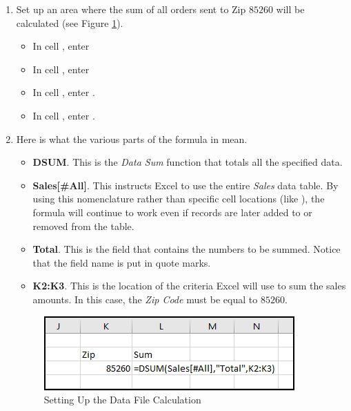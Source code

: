 \begin{enumbox}
	\begin{enumerate}
		\item Set up an area where the sum of all orders sent to Zip $ 85260 $ will be calculated (see Figure \ref{09:fig21}).
	
		\begin{itemize}
			\item In cell , enter 
			\item In cell , enter 
			\item In cell , enter  . 
			\item In cell , enter . 
		\end{itemize}
	
		\item Here is what the various parts of the formula in  mean.		
	
		\begin{itemize}
			\item \textbf{DSUM}. This is the \textit{Data Sum} function that totals all the specified data.
			\item \textbf{Sales[\#All]}. This instructs Excel to use the entire \textit{Sales} data table. By using this nomenclature rather than specific cell locations (like ), the formula will continue to work even if records are later added to or removed from the table.
			\item \textbf{Total}. This is the field that contains the numbers to be summed. Notice that the field name is put in quote marks.
			\item \textbf{K2:K3}. This is the location of the criteria Excel will use to sum the sales amounts. In this case, the \textit{Zip Code} must be equal to $ 85260 $.
		\end{itemize}	
	
		\begin{figure}[H]
			\centering
			\includegraphics[width=\maxwidth{.75\linewidth}]{gfx/ch09_fig21}
			\caption{Setting Up the Data File Calculation}
			\label{09:fig21}
		\end{figure}
	

\end{enumerate}
\end{enumbox}
